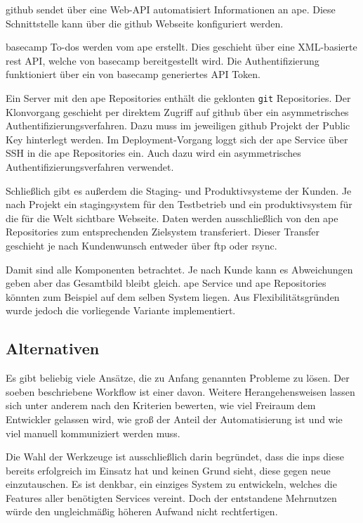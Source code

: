 \gls{github} sendet über eine Web-API automatisiert Informationen an \gls{ape}. Diese Schnittstelle kann über die \gls{github} Webseite konfiguriert werden.

\gls{basecamp} To-dos werden vom \gls{ape} erstellt. Dies geschieht über eine XML-basierte \gls{rest} API, welche von \gls{basecamp} bereitgestellt wird. Die Authentifizierung funktioniert über ein von \gls{basecamp} generiertes API Token.

Ein Server mit den \gls{ape} Repositories enthält die geklonten \lstinline!git! Repositories. Der Klonvorgang geschieht per direktem Zugriff auf \gls{github} über ein asymmetrisches Authentifizierungsverfahren. Dazu muss im jeweiligen \gls{github} Projekt der Public Key hinterlegt werden. Im Deployment-Vorgang loggt sich der \gls{ape} Service über SSH in die \gls{ape} Repositories ein. Auch dazu wird ein asymmetrisches Authentifizierungsverfahren verwendet.

Schließlich gibt es außerdem die Staging- und Produktivsysteme der Kunden. Je nach Projekt ein \gls{stagingsystem} für den Testbetrieb und ein \gls{produktivsystem} für die für die Welt sichtbare Webseite. Daten werden ausschließlich von den \gls{ape} Repositories zum entsprechenden Zielsystem transferiert. Dieser Transfer geschieht je nach Kundenwunsch entweder über \gls{ftp} oder \gls{rsync}.

Damit sind alle Komponenten betrachtet. Je nach Kunde kann es Abweichungen geben aber das Gesamtbild bleibt gleich. \gls{ape} Service und \gls{ape} Repositories könnten zum Beispiel auf dem selben System liegen. Aus Flexibilitätsgründen wurde jedoch die vorliegende Variante implementiert.


\subsection{Alternativen} %
\label{sub:alternativen}

Es gibt beliebig viele Ansätze, die zu Anfang genannten Probleme zu lösen. Der soeben beschriebene Workflow ist einer davon. Weitere Herangehensweisen lassen sich unter anderem nach den Kriterien bewerten, wie viel Freiraum dem Entwickler gelassen wird, wie groß der Anteil der Automatisierung ist und wie viel manuell kommuniziert werden muss.

Die Wahl der Werkzeuge ist ausschließlich darin begründet, dass die \gls{inps} diese bereits erfolgreich im Einsatz hat und keinen Grund sieht, diese gegen neue einzutauschen. Es ist denkbar, ein einziges System zu entwickeln, welches die Features aller benötigten Services vereint. Doch der entstandene Mehrnutzen würde den ungleichmäßig höheren Aufwand nicht rechtfertigen.

